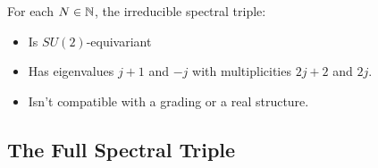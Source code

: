 \begin{proposition}
For each $N \in \mathbb{N}$, the irreducible spectral triple:

    \begin{itemize}
        
    \item Is $SU(2)$-equivariant
    
    \item Has eigenvalues $j+1$ and $-j$ with multiplicities $2j+2$ and $2j$.
        
    \item Isn't compatible with a grading or a real structure.
    \end{itemize}
\end{proposition}


\subsection{The Full Spectral Triple}




    
    
    
    
